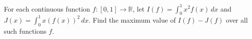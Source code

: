 For each continuous function $f: [0,1] \to \mathbb{R}$, let $I(f) =
\int_0^1 x^2 f(x)\,dx$ and $J(x) = \int_0^1 x \left(f(x)\right)^2\,dx$.
Find the maximum value of $I(f) - J(f)$ over all such functions $f$.
